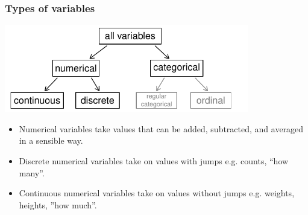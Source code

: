 



\begin{frame}
\frametitle{Types of variables}

\begin{center}
\includegraphics[width=0.8\textwidth]{1-2_data_basics/figures/variables/variables}
\end{center}

\begin{itemize}
\item Numerical variables take values that can be added, subtracted, and averaged in a sensible way.
\item Discrete numerical variables take on values with jumps e.g. counts, ``how many''.
\item Continuous numerical variables take on values without jumps e.g. weights, heights, ''how much''.
\end{itemize}

\end{frame}


